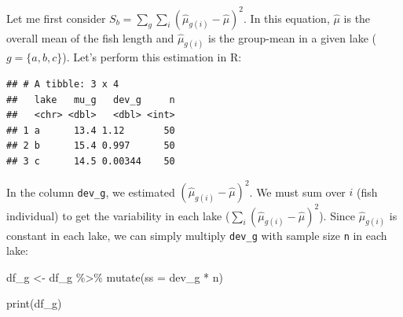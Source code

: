 \documentclass[
]{book}
\newenvironment{Shaded}{\begin{snugshade}}{\end{snugshade}}
\newcommand{\AttributeTok}[1]{\textcolor[rgb]{0.77,0.63,0.00}{#1}}
\newcommand{\CommentTok}[1]{\textcolor[rgb]{0.56,0.35,0.01}{\textit{#1}}}
\newcommand{\DecValTok}[1]{\textcolor[rgb]{0.00,0.00,0.81}{#1}}
\newcommand{\FunctionTok}[1]{\textcolor[rgb]{0.00,0.00,0.00}{#1}}
\newcommand{\NormalTok}[1]{#1}
\newcommand{\OtherTok}[1]{\textcolor[rgb]{0.56,0.35,0.01}{#1}}
\newcommand{\SpecialCharTok}[1]{\textcolor[rgb]{0.00,0.00,0.00}{#1}}
\begin{document}
Let me first consider \(S_b = \sum_g \sum_i (\hat{\mu}_{g(i)} - \hat{\mu})^2\). In this equation, \(\hat{\mu}\) is the overall mean of the fish length and \(\hat{\mu}_{g(i)}\) is the group-mean in a given lake (\(g = \{a, b, c\}\)). Let's perform this estimation in R:

\begin{Shaded}
\end{Shaded}

\begin{verbatim}
## # A tibble: 3 x 4
##   lake   mu_g   dev_g     n
##   <chr> <dbl>   <dbl> <int>
## 1 a      13.4 1.12       50
## 2 b      15.4 0.997      50
## 3 c      14.5 0.00344    50
\end{verbatim}

In the column \texttt{dev\_g}, we estimated \((\hat{\mu}_{g(i)} - \hat{\mu})^2\). We must sum over \(i\) (fish individual) to get the variability in each lake (\(\sum_i (\hat{\mu}_{g(i)} - \hat{\mu})^2\)). Since \(\hat{\mu}_{g(i)}\) is constant in each lake, we can simply multiply \texttt{dev\_g} with sample size \texttt{n} in each lake:

\begin{Shaded}
\begin{Highlighting}[]
\NormalTok{df\_g }\OtherTok{\textless{}{-}}\NormalTok{ df\_g }\SpecialCharTok{\%\textgreater{}\%} 
  \FunctionTok{mutate}\NormalTok{(}\AttributeTok{ss =}\NormalTok{ dev\_g }\SpecialCharTok{*}\NormalTok{ n)}

\FunctionTok{print}\NormalTok{(df\_g)}
\end{Highlighting}
\end{Shaded}
\end{document}
